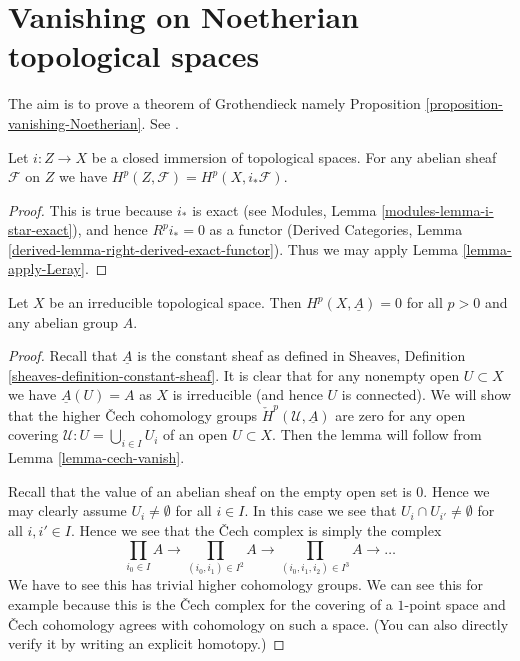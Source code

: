 \section{Vanishing on Noetherian topological spaces}
\label{section-vanishing-Noetherian}

\noindent
The aim is to prove a theorem of Grothendieck namely
Proposition \ref{proposition-vanishing-Noetherian}. See \cite{Tohoku}.

\begin{lemma}
\label{lemma-cohomology-and-closed-immersions}
Let $i : Z \to X$ be a closed immersion of topological spaces.
For any abelian sheaf $\mathcal{F}$ on $Z$ we have
$H^p(Z, \mathcal{F}) = H^p(X, i_*\mathcal{F})$.
\end{lemma}

\begin{proof}
This is true because $i_*$ is exact (see
Modules, Lemma \ref{modules-lemma-i-star-exact}),
and hence $R^pi_* = 0$ as a functor
(Derived Categories, Lemma \ref{derived-lemma-right-derived-exact-functor}).
Thus we may apply Lemma \ref{lemma-apply-Leray}.
\end{proof}

\begin{lemma}
\label{lemma-irreducible-constant-cohomology-zero}
Let $X$ be an irreducible topological space.
Then $H^p(X, \underline{A}) = 0$ for all $p > 0$
and any abelian group $A$.
\end{lemma}

\begin{proof}
Recall that $\underline{A}$ is the constant sheaf as defined
in Sheaves, Definition \ref{sheaves-definition-constant-sheaf}.
It is clear that for any nonempty
open $U \subset X$ we have $\underline{A}(U) = A$ as $X$ is
irreducible (and hence $U$ is connected).
We will show that the higher {\v C}ech cohomology groups
$\check{H}^p(\mathcal{U}, \underline{A})$ are zero for
any open covering $\mathcal{U} : U = \bigcup_{i\in I} U_i$
of an open $U \subset X$. Then the lemma will follow
from Lemma \ref{lemma-cech-vanish}.

\medskip\noindent
Recall that the value of an abelian
sheaf on the empty open set is $0$. Hence we may clearly assume
$U_i \not = \emptyset$ for all $i \in I$. In this case we see
that $U_i \cap U_{i'} \not = \emptyset$ for all $i, i' \in I$.
Hence we see that the {\v C}ech complex is simply the complex
$$
\prod_{i_0 \in I} A \to
\prod_{(i_0, i_1) \in I^2} A \to
\prod_{(i_0, i_1, i_2) \in I^3} A \to
\ldots
$$
We have to see this has trivial higher cohomology groups.
We can see this for example because this is the {\v C}ech complex for the
covering of a $1$-point space and {\v C}ech cohomology agrees with cohomology
on such a space. (You can also directly verify it
by writing an explicit homotopy.)
\end{proof}

